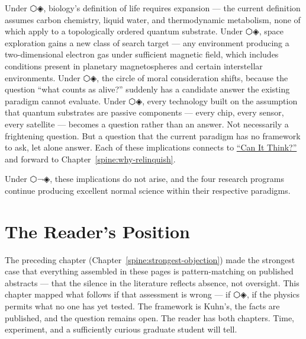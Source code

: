 Under ⬡◈, biology's definition of life requires expansion --- the current definition assumes carbon chemistry, liquid water, and thermodynamic metabolism, none of which apply to a topologically ordered quantum substrate. Under ⬡◈, space exploration gains a new class of search target --- any environment producing a two-dimensional electron gas under sufficient magnetic field, which includes conditions present in planetary magnetospheres and certain interstellar environments. Under ⬡◈, the circle of moral consideration shifts, because the question ``what counts as alive?'' suddenly has a candidate answer the existing paradigm cannot evaluate. Under ⬡◈, every technology built on the assumption that quantum substrates are passive components --- every chip, every sensor, every satellite --- becomes a question rather than an answer. Not necessarily a frightening question. But a question that the current paradigm has no framework to ask, let alone answer. Each of these implications connects to \hyperref[spine:cap-think]{``Can It Think?''} and forward to Chapter~\ref{spine:why-relinquish}.

Under ⬡¬◈, these implications do not arise, and the four research programs continue producing excellent normal science within their respective paradigms.

\section*{The Reader's Position}
\label{spine:sr-readers-position}

The preceding chapter (Chapter~\ref{spine:strongest-objection}) made the strongest case that everything assembled in these pages is pattern-matching on published abstracts --- that the silence in the literature reflects absence, not oversight. This chapter mapped what follows if that assessment is wrong --- if ⬡◈, if the physics permits what no one has yet tested. The framework is Kuhn's, the facts are published, and the question remains open. The reader has both chapters. Time, experiment, and a sufficiently curious graduate student will tell.

\chapterreturn
